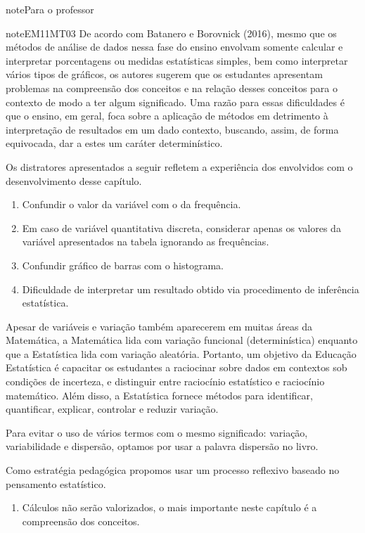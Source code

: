 \begin{sphinxadmonition}{note}{Para o professor}
\begin{sphinxadmonition}{note}{EM11MT03}
De acordo com Batanero e Borovnick (2016), mesmo que os métodos de análise de dados nessa fase do ensino envolvam somente calcular e interpretar porcentagens  ou medidas estatísticas simples, bem como interpretar vários tipos de gráficos, os autores sugerem que os estudantes apresentam problemas na compreensão dos conceitos e na relação desses conceitos para o contexto de modo a ter algum significado. Uma razão para essas dificuldades é que o ensino, em geral, foca sobre a aplicação de métodos em detrimento à interpretação de resultados em um dado contexto, buscando, assim, de forma equivocada, dar a estes um caráter determinístico.

Os distratores apresentados a seguir refletem a experiência dos envolvidos com o desenvolvimento desse capítulo.
\begin{enumerate}
\item {} 
Confundir o valor da variável com o da frequência.

\item {} 
Em caso de variável quantitativa discreta, considerar apenas os valores da variável apresentados na tabela ignorando as frequências.

\item {} 
Confundir gráfico de barras com o histograma.

\item {} 
Dificuldade de interpretar um resultado obtido via procedimento de inferência estatística.

\end{enumerate}

Apesar de variáveis e variação também aparecerem em muitas áreas da Matemática, a Matemática lida com variação funcional (determinística) enquanto que a Estatística lida com variação aleatória. Portanto, um objetivo da Educação Estatística é capacitar os estudantes a raciocinar sobre dados em contextos sob condições de incerteza, e distinguir entre raciocínio estatístico e raciocínio matemático. Além disso, a Estatística fornece métodos para identificar, quantificar, explicar, controlar e reduzir variação.

Para evitar o uso de vários termos com o mesmo significado: variação, variabilidade e dispersão, optamos por usar a palavra dispersão no livro.

Como estratégia pedagógica propomos usar um processo reflexivo baseado no pensamento estatístico.
\begin{enumerate}
\item {} 
Cálculos não serão valorizados, o mais importante neste capítulo é a compreensão dos conceitos.


\end{enumerate}
\end{sphinxadmonition}
\end{sphinxadmonition}
